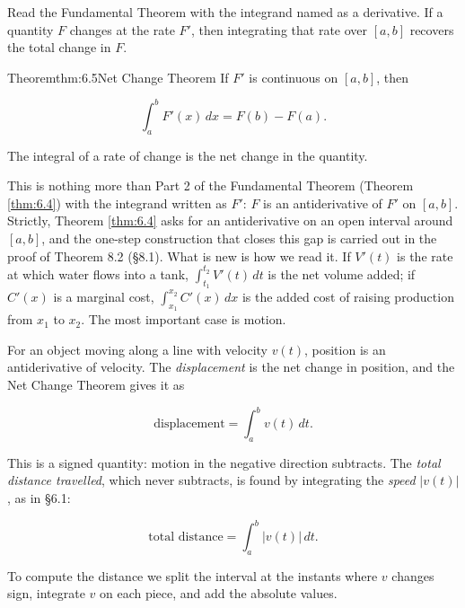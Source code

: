 \documentclass[a4paper,12pt,oneside]{memoir}
\begin{document}
Read the Fundamental Theorem with the integrand named as a derivative. If a quantity \(F\) changes at the rate \(F'\), then integrating that rate over \([a, b]\) recovers the total change in \(F\).

\begin{envtheorem}{Theorem}{thm:6.5}{Net Change Theorem}
If \(F'\) is continuous on \([a, b]\), then

\[ \int_{a}^{b} F'(x)\,dx = F(b) - F(a). \]

The integral of a rate of change is the net change in the quantity.
\end{envtheorem}
This is nothing more than Part 2 of the Fundamental Theorem (Theorem \ref{thm:6.4}) with the integrand written as \(F'\): \(F\) is an antiderivative of \(F'\) on \([a,b]\). Strictly, Theorem \ref{thm:6.4} asks for an antiderivative on an open interval around \([a,b]\), and the one-step construction that closes this gap is carried out in the proof of Theorem 8.2 (§8.1). What is new is how we read it. If \(V'(t)\) is the rate at which water flows into a tank, \(\int_{t_{1}}^{t_{2}} V'(t)\,dt\) is the net volume added; if \(C'(x)\) is a marginal cost, \(\int_{x_{1}}^{x_{2}} C'(x)\,dx\) is the added cost of raising production from \(x_{1}\) to \(x_{2}\). The most important case is motion.

For an object moving along a line with velocity \(v(t)\), position is an antiderivative of velocity. The \emph{displacement} is the net change in position, and the Net Change Theorem gives it as

\[ \text{displacement} = \int_{a}^{b} v(t)\,dt. \]

This is a signed quantity: motion in the negative direction subtracts. The \emph{total distance travelled}, which never subtracts, is found by integrating the \emph{speed} \(\lvert v(t)\rvert\), as in §6.1:

\[ \text{total distance} = \int_{a}^{b} \lvert v(t)\rvert\,dt. \]

To compute the distance we split the interval at the instants where \(v\) changes sign, integrate \(v\) on each piece, and add the absolute values.
\end{document}
